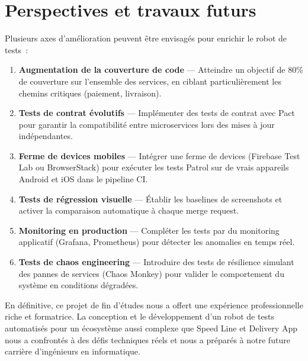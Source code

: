 \section*{Perspectives et travaux futurs}

Plusieurs axes d'amélioration peuvent être envisagés pour enrichir le robot de
tests~:

\begin{enumerate}
  \item \textbf{Augmentation de la couverture de code} --- Atteindre un objectif
    de 80\% de couverture sur l'ensemble des services, en ciblant
    particulièrement les chemins critiques (paiement, livraison).

  \item \textbf{Tests de contrat évolutifs} --- Implémenter des tests de contrat
    avec Pact pour garantir la compatibilité entre microservices lors des
    mises à jour indépendantes.

  \item \textbf{Ferme de devices mobiles} --- Intégrer une ferme de devices
    (Firebase Test Lab ou BrowserStack) pour exécuter les tests Patrol sur
    de vrais appareils Android et iOS dans le pipeline CI.

  \item \textbf{Tests de régression visuelle} --- Établir les baselines de
    screenshots et activer la comparaison automatique à chaque merge
    request.

  \item \textbf{Monitoring en production} --- Compléter les tests par du
    monitoring applicatif (Grafana, Prometheus) pour détecter les anomalies
    en temps réel.

  \item \textbf{Tests de chaos engineering} --- Introduire des tests de
    résilience simulant des pannes de services (Chaos Monkey) pour valider
    le comportement du système en conditions dégradées.
\end{enumerate}

\vspace{1cm}

En définitive, ce projet de fin d'études nous a offert une expérience
professionnelle riche et formatrice. La conception et le développement d'un robot
de tests automatisés pour un écosystème aussi complexe que Speed Line et Delivery
App nous a confrontés à des défis techniques réels et nous a préparés à notre
future carrière d'ingénieurs en informatique.
